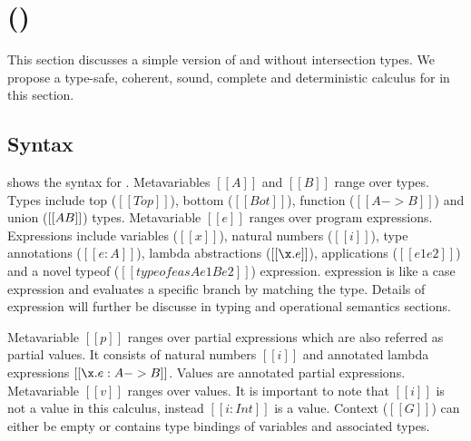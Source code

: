 \section{\name (\cal)}
\label{sec:union}

This section discusses a simple version of \name and without intersection types. We propose a type-safe,
coherent, sound, complete and deterministic calculus for \name in this section.


\subsection{Syntax}\label{sec:union:syntax}
 shows the syntax for \cal. Metavariables $[[A]]$ and $[[B]]$ range over types.
Types include top ($[[Top]]$), bottom ($[[Bot]]$), function ($[[A -> B]]$) and union ($[[A \/ B]]$) types.
Metavariable $[[e]]$ ranges over program expressions. Expressions include variables ($[[x]]$), natural
numbers ($[[i]]$), type annotations ($[[e:A]]$), lambda abstractions ($[[\x.e]]$), applications
($[[e1 e2]]$) and a novel typeof ($[[typeof e as A e1 B e2]]$) expression. \Typeof expression is
like a case expression and evaluates a specific branch by matching the type. Details of \typeof
expression will further be discusse in typing and operational semantics sections.

Metavariable $[[p]]$ ranges over partial expressions which are also referred as partial values.
It consists of natural numbers $[[i]]$ and annotated lambda expressions $[[\x.e : A -> B]]$.
Values are annotated partial expressions. Metavariable $[[v]]$ ranges over values. It is important to
note that $[[i]]$ is not a value in this calculus, instead $[[i:Int]]$ is a value.
Context ($[[G]]$) can either be empty or contains type bindings of variables and associated types.

